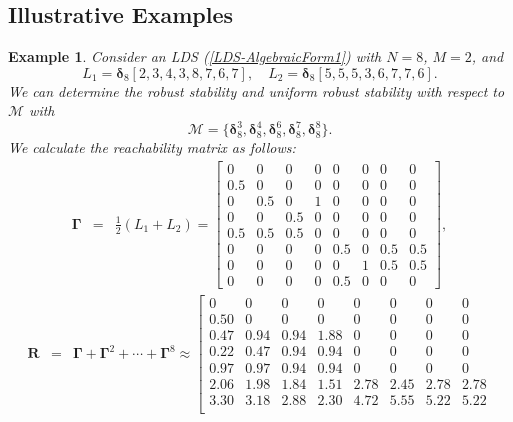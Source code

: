 \documentclass[11pt,onecolumn]{article}
\newtheorem{example}{Example}
\newcommand{\ddelta}{{\boldsymbol\delta}}
\begin{document}
\subsection{Illustrative Examples}\label{SubSectionExample}

\begin{example}\label{Example1}
    Consider an LDS (\ref{LDS-AlgebraicForm1}) with $N = 8$, $M = 2$, and
    \[L_1=\ddelta_8[2,3,4,3,8,7,6,7],\quad L_2=\ddelta_8[5,5,5,3,6,7,7,6].\]
     We can determine the robust stability and uniform robust stability with respect to $\mathcal M$ with
          \[\mathcal M=\{\ddelta_8^3,\ddelta_8^4,\ddelta_8^6,\ddelta_8^7,\ddelta_8^8\}.\]
We calculate the reachability matrix as follows:
\begin{eqnarray*}
   \boldsymbol\Gamma&=&\frac{1}{2}(L_1+ L_2)=\left[
    \begin{array}{cccccccc}
       0&0&0&0&0&0&0&0\\
       0.5&0&0&0&0&0&0&0\\
       0&0.5&0&1&0&0&0&0\\
       0&0&0.5&0&0&0&0&0\\
       0.5&0.5&0.5&0&0&0&0&0\\
       0&0&0&0&0.5&0&0.5&0.5\\
       0&0&0&0&0&1&0.5&0.5\\
       0&0&0&0&0.5&0&0&0
    \end{array}
\right],
\end{eqnarray*}
\begin{eqnarray*}
   \mathbf R&=&\boldsymbol\Gamma+ \boldsymbol\Gamma^2+ \cdots+\boldsymbol\Gamma^8\approx\left[
     \begin{array}{cccccccc}
         0    &     0   &      0   &      0  &        0  &        0    &      0 &         0\\
    0.50 &      0    &      0   &       0  &        0    &      0   &       0    &      0\\
    0.47  &   0.94 &     0.94 &    1.88    &      0    &      0   &       0    &      0\\
    0.22 &    0.47  &   0.94  &   0.94     &     0  &        0    &      0   &       0\\
    0.97 &    0.97  &   0.94  &   0.94     &     0   &       0    &      0  &        0\\
    2.06  &   1.98  &   1.84  &   1.51  &   2.78  &   2.45  &   2.78  & 2.78\\
    3.30 &   3.18 &    2.88 &   2.30 &     4.72 &   5.55 &     5.22 &     5.22\\

\end{array}
\end{eqnarray*}
\end{example}
\end{document}
